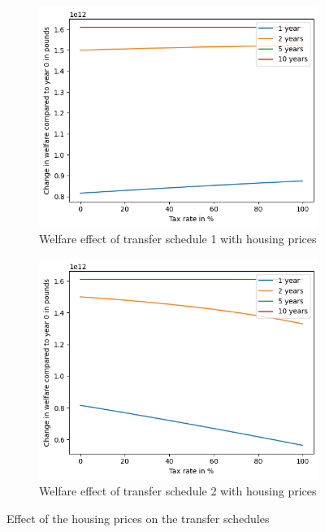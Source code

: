 \documentclass[10pt,a4paper]{article}
\begin{document}
\begin{figure}[H]
\centering
\begin{subfigure}{.45\textwidth}
    \centering
    \includegraphics[width=\textwidth]{Report/schedule31.png}
    \caption{Welfare effect of transfer schedule 1 with housing prices}
\end{subfigure}
\begin{subfigure}{.45\textwidth}
    \centering
    \includegraphics[width=\textwidth]{Report/schedule32.png}
    \caption{Welfare effect of transfer schedule 2 with housing prices}
\end{subfigure}
\caption{Effect of the housing prices on the transfer schedules}
\label{fig:housing}
\end{figure}
\end{document}

